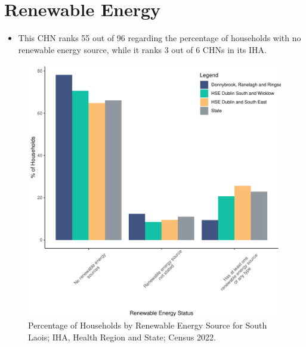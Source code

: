 \documentclass{article}
\begin{document}
\section{Renewable Energy}\label{sect:RE}
\begin{itemize}
\item This CHN ranks  55 out of 96 regarding the percentage of households with no renewable energy source, while it ranks   3 out of 6 CHNs in its IHA.
\end{itemize}
\begin{figure}[H]
	\centering
	\includegraphics[width = 140mm]{../figures/RenewableEnergyED.pdf}
	\caption{Percentage of Households by Renewable Energy Source for South Laois; IHA, Health Region and State; Census 2022.}
	\label{fig:vbnv}
	\end{figure}
\end{document}
